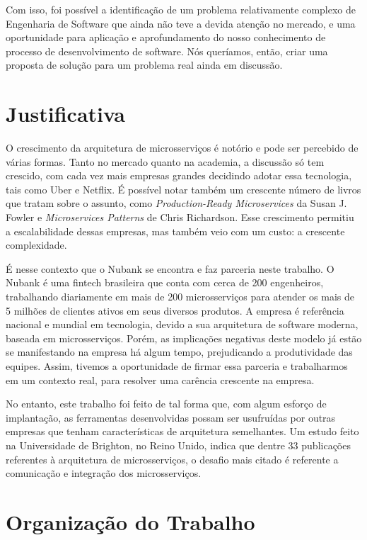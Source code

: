 \documentclass[twosideprint]{politex}
\begin{document}
	Com isso, foi possível a identificação de um problema relativamente complexo de Engenharia de Software que ainda não teve a devida atenção no mercado, e uma oportunidade para aplicação e aprofundamento do nosso conhecimento de processo de desenvolvimento de software. Nós queríamos, então, criar uma proposta de solução para um problema real ainda em discussão.
	\section{Justificativa}
	O crescimento da arquitetura de microsserviços é notório e pode ser percebido de várias formas. Tanto no mercado quanto na academia, a discussão só tem crescido, com cada vez mais empresas grandes decidindo adotar essa tecnologia, tais como Uber e Netflix. É possível notar também um crescente número de livros que tratam sobre o assunto, como \textit{Production-Ready Microservices} da Susan J. Fowler\cite{productionreadyms} e \textit{Microservices Patterns} de Chris Richardson\cite{mspatterns}. Esse crescimento permitiu a escalabilidade dessas empresas, mas também veio com um custo: a crescente complexidade.
	
	É nesse contexto que o Nubank se encontra e faz parceria neste trabalho. O Nubank é uma fintech brasileira que conta com cerca de 200 engenheiros, trabalhando diariamente em mais de 200 microsserviços para atender os mais de 5 milhões de clientes ativos em seus diversos produtos. A empresa é referência nacional e mundial em tecnologia, devido a sua arquitetura de software moderna, baseada em microsserviços. Porém, as implicações negativas deste modelo já estão se manifestando na empresa há algum tempo, prejudicando a produtividade das equipes. Assim, tivemos a oportunidade de firmar essa parceria e trabalharmos em um contexto real, para resolver uma carência crescente na empresa.
	
	No entanto, este trabalho foi feito de tal forma que, com algum esforço de implantação, as ferramentas desenvolvidas possam ser usufruídas por outras empresas que tenham características de arquitetura semelhantes. Um estudo feito na Universidade de Brighton, no Reino Unido, indica que dentre 33 publicações referentes à arquitetura de microsserviços, o desafio mais citado é referente a comunicação e integração dos microsserviços.\cite{systematicmapping}
	\section{Organização do Trabalho}
	
\end{document}
